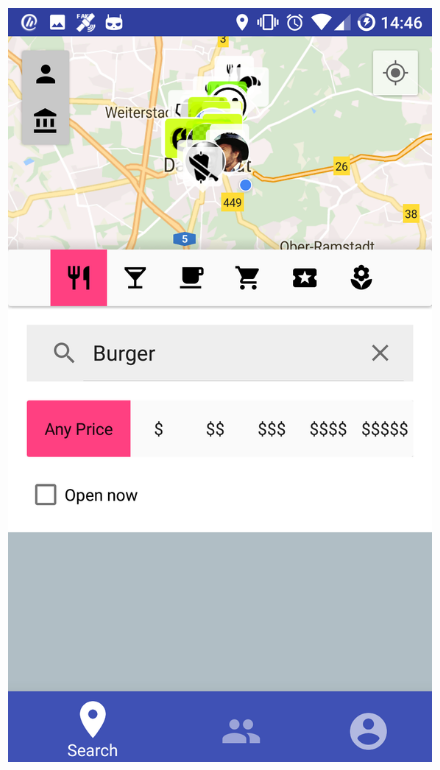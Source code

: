 \documentclass[11pt, accentcolor=tud1c]{tudreport}
\begin{document}
\begin{figure}[h]
\begin{minipage}{.3\textwidth}
  \includegraphics[width=.8\linewidth]{./res/search.png}
  \label{fig:friends_view}
\end{minipage}
\begin{minipage}{.3\textwidth}
  \centering

\end{minipage}
\end{figure}
\end{document}
